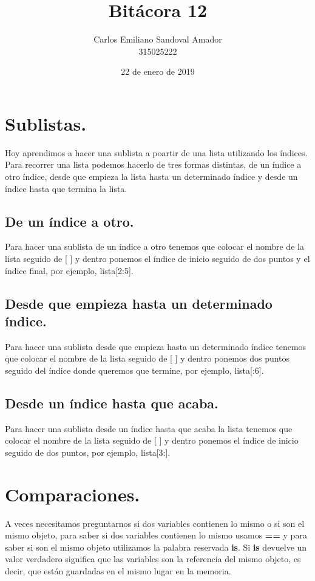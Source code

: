 \documentclass[letterpaper, 12pt, oneside]{article}%
\title{Bitácora 12}
\author{Carlos Emiliano Sandoval Amador \\ 315025222}
\date{22 de enero de 2019}
\begin{document}
	\maketitle %
	\section{Sublistas.} %
	Hoy aprendimos a hacer una sublista a poartir de una lista utilizando los índices. Para recorrer una lista podemos hacerlo de tres formas distintas, de un índice a otro índice, desde que empieza la lista hasta un determinado índice y desde un índice hasta que termina la lista.
	\subsection{De un índice a otro.}
	Para hacer una sublista de un índice a otro tenemos que colocar el nombre de la lista seguido de [ ] y dentro ponemos el índice de inicio seguido de dos puntos y el índice final, por ejemplo, lista[2:5].
	\subsection{Desde que empieza hasta un determinado índice.}
	Para hacer una sublista desde que empieza hasta un determinado índice tenemos que colocar el nombre de la lista seguido de [ ] y dentro ponemos dos puntos seguido del índice donde queremos que termine, por ejemplo, lista[:6].
	\subsection{Desde un índice hasta que acaba.}
	Para hacer una sublista desde un índice hasta que acaba la lista tenemos que colocar el nombre de la lista seguido de [ ] y dentro ponemos el índice de inicio seguido de dos puntos, por ejemplo, lista[3:].
	\section{Comparaciones.}
	A veces necesitamos preguntarnos si dos variables contienen lo mismo o si son el mismo objeto, para saber si dos variables contienen lo mismo usamos \textbf{==} y para saber si son el mismo objeto utilizamos la palabra reservada \textbf{is}. Si \textbf{is} devuelve un valor verdadero significa que las variables son la referencia del mismo objeto, es decir, que están guardadas en el mismo lugar en la memoria.
\end{document}
